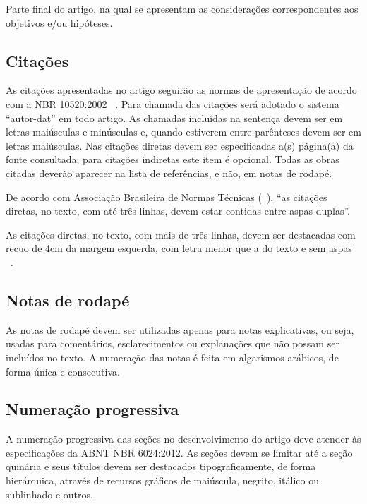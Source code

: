 \documentclass[article,a4paper,12pt,brazil,sumario=tradicional]{abntex2}
\renewenvironment{quotation}
  {\small\list{}{\rightmargin=0cm \leftmargin=2cm}%
   \item\relax}
  {\endlist}
\begin{document}
Parte final do artigo, na qual se apresentam as considerações correspondentes aos objetivos e/ou hipóteses.

\subsection{Citações}

As citações apresentadas no artigo seguirão as normas de apresentação de acordo com a NBR 10520:2002 ~\cite{bibliografica6023}. Para chamada das citações será adotado o sistema ``autor-dat'' em todo artigo. As chamadas incluídas na sentença devem ser em letras maiúsculas e minúsculas e, quando estiverem entre parênteses devem ser em letras maiúsculas. Nas citações diretas devem ser especificadas a(s) página(a) da fonte consultada; para citações indiretas este item é opcional. Todas as obras citadas deverão aparecer na lista de referências, e não, em notas de rodapé.

De acordo com Associação Brasileira de Normas Técnicas (~\citeyear{bibliografica6023}), ``as citações diretas, no texto, com até três linhas, devem estar contidas entre aspas duplas''.

\begin{quotation}
\noindent
As citações diretas, no texto, com mais de três linhas, devem ser destacadas com recuo de 4cm da margem esquerda, com letra menor que a do texto e sem aspas ~\cite{bibliografica6023}.
\end{quotation}

\subsection{Notas de rodapé}

As notas de rodapé devem ser utilizadas apenas para notas explicativas, ou seja, usadas para comentários, esclarecimentos ou explanações que não possam ser incluídos no texto. A numeração das notas é feita em algarismos arábicos, de forma única e consecutiva.

\subsection{Numeração progressiva}

A numeração progressiva das seções no desenvolvimento do artigo deve atender às especificações da ABNT NBR 6024:2012. As seções devem se limitar até a seção quinária e seus títulos devem ser destacados tipograficamente, de forma hierárquica, através de recursos gráficos de maiúscula, negrito, itálico ou sublinhado e outros.
\end{document}
